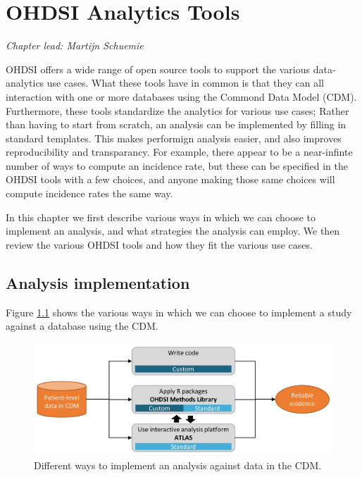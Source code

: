 \documentclass[11pt]{book}
\begin{document}
\chapter{OHDSI Analytics Tools}\label{OhdsiAnalyticsTools}

\emph{Chapter lead: Martijn Schuemie}

OHDSI offers a wide range of open source tools to support the various
data-analytics use cases. What these tools have in common is that they
can all interaction with one or more databases using the Commond Data
Model (CDM). Furthermore, these tools standardize the analytics for
various use cases; Rather than having to start from scratch, an analysis
can be implemented by filling in standard templates. This makes
performign analysis easier, and also improves reproducibility and
transparancy. For example, there appear to be a near-infinte number of
ways to compute an incidence rate, but these can be specified in the
OHDSI tools with a few choices, and anyone making those same choices
will compute incidence rates the same way.

In this chapter we first describe various ways in which we can choose to
implement an analysis, and what strategies the analysis can employ. We
then review the various OHDSI tools and how they fit the various use
cases.

\section{Analysis implementation}\label{analysis-implementation}

Figure \ref{fig:implementations} shows the various ways in which we can
choose to implement a study against a database using the CDM.

\begin{figure}

{\centering \includegraphics[width=0.9\linewidth]{images/OhdsiAnalyticsTools/implementations} 

}

\caption{Different ways to implement an analysis against data in the CDM.}\label{fig:implementations}
\end{figure}
\end{document}
